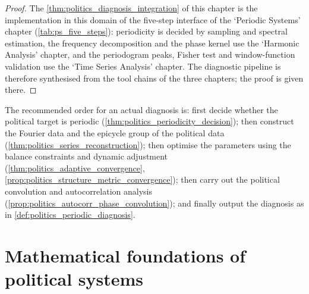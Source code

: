 \begin{proof}
The \cref{thm:politics_diagnosis_integration} of this chapter is the implementation in this domain of the five-step interface of the `Periodic Systems' chapter (\cref{tab:ps_five_steps}):
periodicity is decided by sampling and spectral estimation, the frequency decomposition and the phase kernel use the `Harmonic Analysis' chapter, and the periodogram peaks, Fisher test and
window-function validation use the `Time Series Analysis' chapter. The diagnostic pipeline is therefore synthesised from the tool chains of the three chapters; the proof is given there.
\end{proof}

\begin{remark}\label{rem:politics_integration_order}
The recommended order for an actual diagnosis is: first decide whether the political target is periodic (\cref{thm:politics_periodicity_decision}); then construct the Fourier data and the epicycle group of the political data (\cref{thm:politics_series_reconstruction}); then optimise the parameters using the balance constraints and dynamic adjustment (\cref{thm:politics_adaptive_convergence}, \cref{prop:politics_structure_metric_convergence}); then carry out the political convolution and autocorrelation analysis (\cref{prop:politics_autocorr_phase_convolution}); and finally output the diagnosis as in \cref{def:politics_periodic_diagnosis}.
\end{remark}

\section{Mathematical foundations of political systems}

